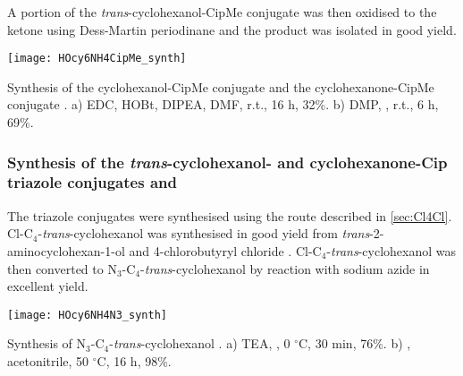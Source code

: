 A portion of the \textit{trans}-cyclohexanol-CipMe conjugate  was then oxidised to the ketone using Dess-Martin periodinane and the product was isolated in good yield.

\begin{scheme}[H]
	\begin{center}
		\texttt{[image: HOcy6NH4CipMe\_synth]}
		\caption{Synthesis of the cyclohexanol-CipMe conjugate  and the cyclohexanone-CipMe conjugate . 
		a) EDC, HOBt, DIPEA, DMF, r.t., 16 h, 32\%.
		b) DMP, , r.t., 6 h, 69\%.
		\label{sch:HOcy6NH4CipMe_synth}}
	\end{center}
\end{scheme}

\subsubsection{Synthesis of the \textit{trans}-cyclohexanol- and cyclohexanone-Cip triazole conjugates  and }

The triazole conjugates were synthesised using the route described in \ref{sec:Cl4Cl}. Cl-C$_4$-\textit{trans}-cyclohexanol  was synthesised in good yield from \textit{trans}-2-aminocyclohexan-1-ol  and 4-chlorobutyryl chloride . 
Cl-C$_4$-\textit{trans}-cyclohexanol  was then converted to N$_3$-C$_4$-\textit{trans}-cyclohexanol  by reaction with sodium azide in excellent yield. 

\begin{scheme}[H]
	\begin{center}
		\texttt{[image: HOcy6NH4N3\_synth]}
		\caption{Synthesis of N$_3$-C$_4$-\textit{trans}-cyclohexanol . 
		a) TEA, , 0 $^{\circ}$C, 30 min, 76\%.
		b) , acetonitrile, 50 $^\circ$C, 16 h, 98\%.
		\label{sch:HOcy6NH4N3_synth}}
	\end{center}
\end{scheme}

